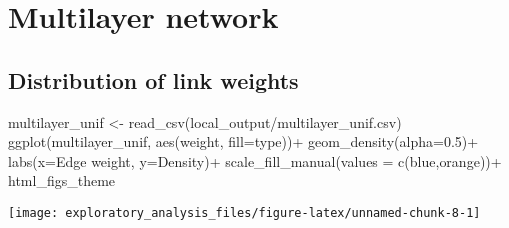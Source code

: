 \documentclass[
]{article}
\newenvironment{Shaded}{\begin{snugshade}}{\end{snugshade}}
\newcommand{\AttributeTok}[1]{\textcolor[rgb]{0.77,0.63,0.00}{#1}}
\newcommand{\FloatTok}[1]{\textcolor[rgb]{0.00,0.00,0.81}{#1}}
\newcommand{\FunctionTok}[1]{\textcolor[rgb]{0.00,0.00,0.00}{#1}}
\newcommand{\NormalTok}[1]{#1}
\newcommand{\OtherTok}[1]{\textcolor[rgb]{0.56,0.35,0.01}{#1}}
\newcommand{\SpecialCharTok}[1]{\textcolor[rgb]{0.00,0.00,0.00}{#1}}
\newcommand{\StringTok}[1]{\textcolor[rgb]{0.31,0.60,0.02}{#1}}
\begin{document}
\hypertarget{multilayer-network}{%
\section{Multilayer network}\label{multilayer-network}}

\hypertarget{distribution-of-link-weights}{%
\subsection{Distribution of link
weights}\label{distribution-of-link-weights}}

\begin{Shaded}
\begin{Highlighting}[]
\NormalTok{multilayer\_unif }\OtherTok{\textless{}{-}} \FunctionTok{read\_csv}\NormalTok{(}\StringTok{\textquotesingle{}local\_output/multilayer\_unif.csv\textquotesingle{}}\NormalTok{)}
 \FunctionTok{ggplot}\NormalTok{(multilayer\_unif, }\FunctionTok{aes}\NormalTok{(weight, }\AttributeTok{fill=}\NormalTok{type))}\SpecialCharTok{+}
  \FunctionTok{geom\_density}\NormalTok{(}\AttributeTok{alpha=}\FloatTok{0.5}\NormalTok{)}\SpecialCharTok{+}
  \FunctionTok{labs}\NormalTok{(}\AttributeTok{x=}\StringTok{\textquotesingle{}Edge weight\textquotesingle{}}\NormalTok{, }\AttributeTok{y=}\StringTok{\textquotesingle{}Density\textquotesingle{}}\NormalTok{)}\SpecialCharTok{+}
  \FunctionTok{scale\_fill\_manual}\NormalTok{(}\AttributeTok{values =} \FunctionTok{c}\NormalTok{(}\StringTok{\textquotesingle{}blue\textquotesingle{}}\NormalTok{,}\StringTok{\textquotesingle{}orange\textquotesingle{}}\NormalTok{))}\SpecialCharTok{+}
\NormalTok{ html\_figs\_theme}
\end{Highlighting}
\end{Shaded}

\texttt{[image: exploratory\_analysis\_files/figure-latex/unnamed-chunk-8-1]}
\end{document}
